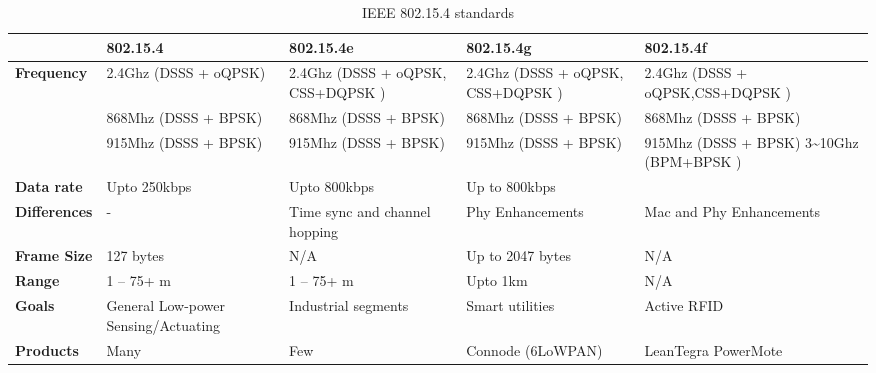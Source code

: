 \begin{table}[h!]
\scriptsize
	\begin{tabulary}{\textwidth}{|p{6em}|L|L|L|L|}
	\                           & \textbf{802.15.4}                   & \textbf{802.15.4e}                       & \textbf{802.15.4g}                & \textbf{802.15.4f}                      \\\hline
	\textbf{Frequency}          & 2.4Ghz (DSSS + oQPSK)               & 2.4Ghz (DSSS + oQPSK, CSS+DQPSK )        & 2.4Ghz (DSSS + oQPSK, CSS+DQPSK ) & 2.4Ghz (DSSS + oQPSK,CSS+DQPSK )        \\
	\                           & 868Mhz (DSSS + BPSK)                & 868Mhz (DSSS + BPSK)                     & 868Mhz (DSSS + BPSK)              & 868Mhz (DSSS + BPSK)                    \\
	\                           & 915Mhz (DSSS + BPSK)                & 915Mhz (DSSS + BPSK)                     & 915Mhz (DSSS + BPSK)              & 915Mhz (DSSS + BPSK) 3\sim 10Ghz (BPM+BPSK )\\
	\textbf{Data rate}          & Upto 250kbps                        & Upto 800kbps                             & Up to 800kbps                     &                                         \\
	\textbf{Differences}        & -                                   & Time sync and channel hopping            & Phy Enhancements                  & Mac and Phy Enhancements                \\
	\textbf{Frame Size}         & 127 bytes                           & N/A                                      & Up to 2047 bytes                  & N/A                                     \\
	\textbf{Range}              & 1 – 75+ m                           & 1 – 75+ m                                & Upto 1km                          & N/A                                     \\
	\textbf{Goals}              & General Low-power Sensing/Actuating & Industrial segments                      & Smart utilities                   & Active RFID                             \\
	\textbf{Products}           & Many                                & Few                                      & Connode (6LoWPAN)                 & LeanTegra PowerMote                     \\\hline
	\end{tabulary}
\caption{\label{tab:IEEE_802.15.4_standards} IEEE 802.15.4 standards \cite{sarwar_iot_}}
\end{table}



